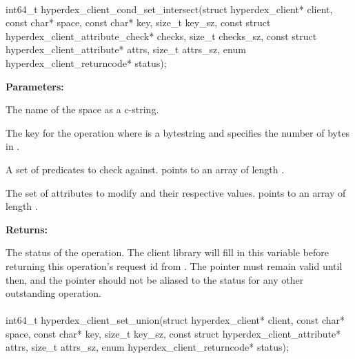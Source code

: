 \paragraph{}
\label{api:c:cond_set_intersect}
\begin{ccode}
int64_t hyperdex_client_cond_set_intersect(struct hyperdex_client* client,
                const char* space,
                const char* key, size_t key_sz,
                const struct hyperdex_client_attribute_check* checks, size_t checks_sz,
                const struct hyperdex_client_attribute* attrs, size_t attrs_sz,
                enum hyperdex_client_returncode* status);
\end{ccode}
\funcdesc 

\noindent\textbf{Parameters:}
\begin{description}[labelindent=\widthof{{\code{checks}, \code{checks\_sz}}},leftmargin=*,noitemsep,nolistsep,align=right]
\item[\code{space}] The name of the space as a c-string.
\item[\code{key}, \code{key\_sz}] The key for the operation where  is a bytestring and  specifies the number of bytes in .
\item[\code{checks}, \code{checks\_sz}] A set of predicates to check against.   points to an array of length .
\item[\code{attrs}, \code{attrs\_sz}] The set of attributes to modify and their respective values.   points to an array of length .
\end{description}

\noindent\textbf{Returns:}
\begin{description}[labelindent=\widthof{{\code{status}}},leftmargin=*,noitemsep,nolistsep,align=right]
\item[\code{status}] The status of the operation.  The client library will fill in this variable before returning this operation's request id from .  The pointer must remain valid until then, and the pointer should not be aliased to the status for any other outstanding operation.
\end{description}

\paragraph{}
\label{api:c:set_union}
\begin{ccode}
int64_t hyperdex_client_set_union(struct hyperdex_client* client,
                const char* space,
                const char* key, size_t key_sz,
                const struct hyperdex_client_attribute* attrs, size_t attrs_sz,
                enum hyperdex_client_returncode* status);
\end{ccode}
\funcdesc 

